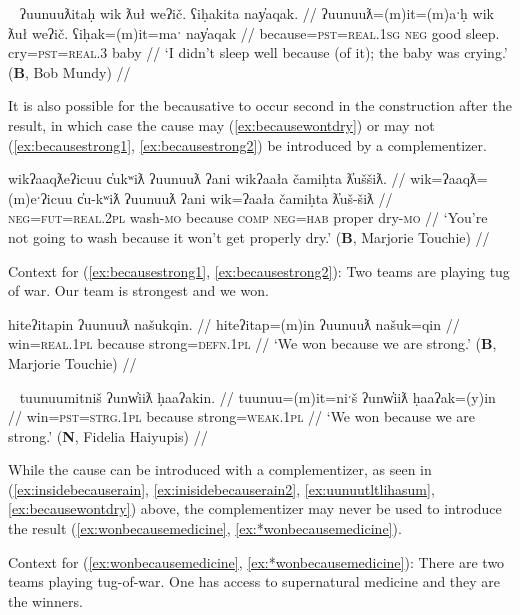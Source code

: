 \ex~ \label{ex:whydidntsleep}
\begingl
\glpreamble ʔuunuuƛitaḥ wik ƛuł weʔič. ʕiḥakita nay̓aqak. //
\gla ʔuunuuƛ=(m)it=(m)aˑḥ wik ƛuł weʔič. ʕiḥak=(m)it=maˑ nay̓aqak //
\glb because=\textsc{pst}=\textsc{real.1sg} \textsc{neg} good sleep. cry=\textsc{pst}=\textsc{real.3} baby //
\glft `I didn't sleep well because (of it); the baby was crying.' (\textbf{B}, Bob Mundy) //
\endgl
\xe

It is also possible for the becausative to occur second in the construction after the result, in which case the cause may (\ref{ex:becausewontdry}) or may not (\ref{ex:becausestrong1}, \ref{ex:becausestrong2}) be introduced by a complementizer.

\ex \label{ex:becausewontdry}
\begingl
\glpreamble wikʔaaqƛeʔicuu c̓ukʷiƛ ʔuunuuƛ ʔani wikʔaała čamiḥta ƛ̓uššiƛ. //
\gla wik=ʔaaqƛ=(m)eˑʔicuu c̓u-kʷiƛ ʔuunuuƛ ʔani wik=ʔaała čamiḥta ƛ̓uš-šiƛ //
\glb \textsc{neg}=\textsc{fut}=\textsc{real.2pl} wash-\textsc{mo} because \textsc{comp} \textsc{neg}=\textsc{hab} proper dry-\textsc{mo} //
\glft `You’re not going to wash because it won’t get properly dry.' (\textbf{B}, Marjorie Touchie) //
\endgl
\xe

\vspace{5pt}

\noindent Context for (\ref{ex:becausestrong1}, \ref{ex:becausestrong2}): Two teams are playing tug of war. Our team is strongest and we won.

\ex \label{ex:becausestrong1}
\begingl
\glpreamble hiteʔitapin ʔuunuuƛ našukqin. //
\gla hiteʔitap=(m)in ʔuunuuƛ našuk=qin //
\glb win=\textsc{real.1pl} because strong=\textsc{defn.1pl} //
\glft `We won because we are strong.' (\textbf{B}, Marjorie Touchie) //
\endgl
\xe

\ex~ \label{ex:becausestrong2}
\begingl
\glpreamble tuunuumitniš ʔunw̓iiƛ ḥaaʔakin. //
\gla tuunuu=(m)it=niˑš ʔunw̓iiƛ ḥaaʔak=(y)in //
\glb win=\textsc{pst}=\textsc{strg.1pl} because strong=\textsc{weak.1pl} //
\glft `We won because we are strong.' (\textbf{N}, Fidelia Haiyupis) //
\endgl
\xe


While the cause can be introduced with a complementizer, as seen in (\ref{ex:insidebecauserain}, \ref{ex:inisidebecauserain2}, \ref{ex:uunuutltlihasum}, \ref{ex:becausewontdry}) above, the complementizer may never be used to introduce the result (\ref{ex:wonbecausemedicine}, \ref{ex:*wonbecausemedicine}).

\vspace{5pt}

Context for (\ref{ex:wonbecausemedicine}, \ref{ex:*wonbecausemedicine}): There are two teams playing tug-of-war. One has access to supernatural medicine and they are the winners.

